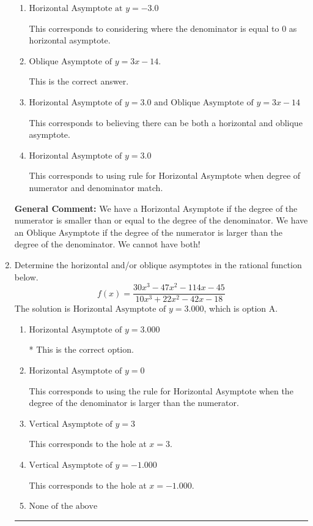 \documentclass{extbook}[14pt]
\newcommand{\litem}[1]{\item #1

\rule{\textwidth}{0.4pt}}
\begin{document}
\begin{enumerate}
{\begin{enumerate}[label=\Alph*.]
This corresponds to believing there can be both a horizontal and oblique asymptote AND mixing up horizontal/vertical asymoptote.
\item \( \text{Horizontal Asymptote at } y = -3.0 \)

This corresponds to considering where the denominator is equal to 0 as horizontal asymptote.
\item \( \text{Oblique Asymptote of } y = 3x -14. \)

This is the correct answer.
\item \( \text{Horizontal Asymptote of } y = 3.0 \text{ and Oblique Asymptote of } y = 3x -14 \)

This corresponds to believing there can be both a horizontal and oblique asymptote.
\item \( \text{Horizontal Asymptote of } y = 3.0  \)

This corresponds to using rule for Horizontal Asymptote when degree of numerator and denominator match.
\end{enumerate}

\textbf{General Comment:} We have a Horizontal Asymptote if the degree of the numerator is smaller than or equal to the degree of the denominator. We have an Oblique Asymptote if the degree of the numerator is larger than the degree of the denominator. We cannot have both!
}
\litem{
Determine the horizontal and/or oblique asymptotes in the rational function below.
\[ f(x) = \frac{30x^{3} -47 x^{2} -114 x -45}{10x^{3} +22 x^{2} -42 x -18} \]The solution is \( \text{Horizontal Asymptote of } y = 3.000  \), which is option A.\begin{enumerate}[label=\Alph*.]
\item \( \text{Horizontal Asymptote of } y = 3.000  \)

* This is the correct option.
\item \( \text{Horizontal Asymptote of } y = 0  \)

This corresponds to using the rule for Horizontal Asymptote when the degree of the denominator is larger than the numerator.
\item \( \text{Vertical Asymptote of } y = 3  \)

This corresponds to the hole at $x = 3$.
\item \( \text{Vertical Asymptote of } y = -1.000  \)

This corresponds to the hole at $x = -1.000$.
\item \( \text{None of the above} \)


\end{enumerate}}
\end{enumerate}
\end{document}
